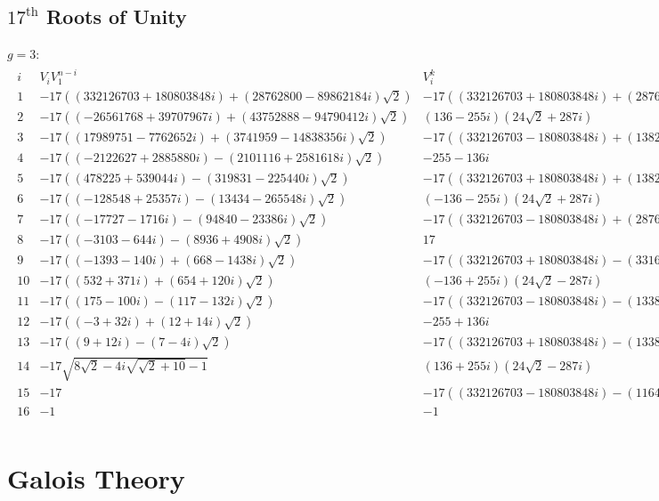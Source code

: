 \documentclass{article}
\renewcommand\({\left(}
\renewcommand\){\right)}
\begin{document}
\begin{landscape}
\newpage
\subsection{$17^\text{th}$ Roots of Unity}
\vspace{6mm}
$g=3$:
\begin{align*}
    \begin{array}{c|c|c|c|c|c}
        i&V_iV_1^{n-i}&V_i^k&k&q\\
        \hline
        1 & -17 \left((332126703+180803848 i)+(28762800-89862184 i) \sqrt{2}\right) & -17 \left((332126703+180803848 i)+(28762800-89862184 i) \sqrt{2}\right) & 16 & 2 \\
        2 & -17 \left((-26561768+39707967 i)+(43752888-94790412 i) \sqrt{2}\right) & (136-255 i) \left(24 \sqrt{2}+287 i\right) & 8 & 7 \\
        3 & -17 \left((17989751-7762652 i)+(3741959-14838356 i) \sqrt{2}\right) & -17 \left((332126703-180803848 i)+(138288240-114771640 i) \sqrt{2}\right) & 16 & 4 \\
        4 & -17 \left((-2122627+2885880 i)-(2101116+2581618 i) \sqrt{2}\right) & -255-136 i & 4 & 0 \\
        5 & -17 \left((478225+539044 i)-(319831-225440 i) \sqrt{2}\right) & -17 \left((332126703+180803848 i)+(138288240+9649528 i) \sqrt{2}\right) & 16 & 12 \\
        6 & -17 \left((-128548+25357 i)-(13434-265548 i) \sqrt{2}\right) & (-136-255 i) \left(24 \sqrt{2}+287 i\right) & 8 & 1 \\
        7 & -17 \left((-17727-1716 i)-(94840-23386 i) \sqrt{2}\right) & -17 \left((332126703-180803848 i)+(28762800-77188856 i) \sqrt{2}\right) & 16 & 8 \\
        8 & -17 \left((-3103-644 i)-(8936+4908 i) \sqrt{2}\right) & 17 & 2 & 0 \\
        9 & -17 \left((-1393-140 i)+(668-1438 i) \sqrt{2}\right) & -17 \left((332126703+180803848 i)-(33166128-15838968 i) \sqrt{2}\right) & 16 & 15 \\
        10 & -17 \left((532+371 i)+(654+120 i) \sqrt{2}\right) & (-136+255 i) \left(24 \sqrt{2}-287 i\right) & 8 & 6 \\
        11 & -17 \left((175-100 i)-(117-132 i) \sqrt{2}\right) & -17 \left((332126703-180803848 i)-(133884912-40748424 i) \sqrt{2}\right) & 16 & 11 \\
        12 & -17 \left((-3+32 i)+(12+14 i) \sqrt{2}\right) & -255+136 i & 4 & 3 \\
        13 & -17 \left((9+12 i)-(7-4 i) \sqrt{2}\right) & -17 \left((332126703+180803848 i)-(133884912-64373688 i) \sqrt{2}\right) & 16 & 3 \\
        14 & -17 \sqrt{8 \sqrt{2}-4 i \sqrt{\sqrt{2}+10}-1} & (136+255 i) \left(24 \sqrt{2}-287 i\right) & 8 & 0 \\
        15 & -17 & -17 \left((332126703-180803848 i)-(116402128-92885528 i) \sqrt{2}\right) & 16 & 5 \\
        16 & -1 & -1 & 1 & 0 \\
    \end{array}
\end{align*}
\end{landscape}

\newpage
\section{Galois Theory}
\end{document}
